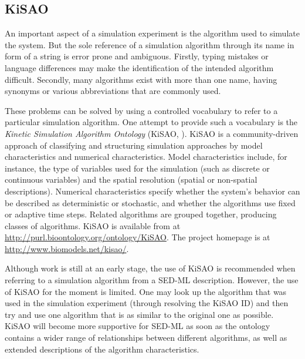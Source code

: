 \subsection{KiSAO}
\label{sec:kisao}

An important aspect of a simulation experiment is the algorithm used to simulate the system.
But the sole reference of a simulation algorithm through its name in form of a string is error prone and ambiguous. Firstly, typing mistakes or language differences may make the identification of the intended algorithm difficult. Secondly, many algorithms exist with more than one name, having synonyms or various abbreviations that are commonly used.

These problems can be solved by using a controlled vocabulary to refer to a particular simulation algorithm. One attempt to provide such a vocabulary is the \emph{Kinetic Simulation Algorithm Ontology} (KiSAO, \citep{CWK+10}). KiSAO is a community-driven approach of classifying and structuring simulation approaches by model characteristics and numerical characteristics.  Model characteristics include, for instance, the type of variables used for the simulation (such as discrete or continuous variables) and the spatial resolution (spatial or non-spatial descriptions). Numerical characteristics specify whether the system's behavior can be described as deterministic or stochastic, and whether the algorithms use fixed or adaptive time steps.  
Related algorithms are grouped together, producing classes of algorithms.
KiSAO is available from  at \url{http://purl.bioontology.org/ontology/KiSAO}. The project homepage is at \url{http://www.biomodels.net/kisao/}.
%
%

Although work is still at an early stage, the use of KiSAO is recommended when referring to a simulation algorithm from a SED-ML description. However, the use of KiSAO for the moment is limited. One may look up the algorithm that was used in the simulation experiment (through resolving the KiSAO ID) and then try and use one algorithm that is as similar to the original one as possible. KiSAO will become more supportive for SED-ML as soon as the ontology contains a wider range of relationships between different algorithms, as well as extended descriptions of the algorithm characteristics.


